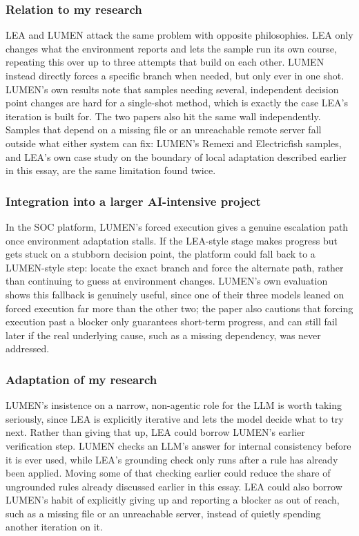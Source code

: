 \documentclass[11pt,a4paper]{article}
\begin{document}
\subsubsection{Relation to my research}

LEA and LUMEN attack the same problem with opposite philosophies.
LEA only changes what the environment reports and lets the sample run its own course, repeating this over up to three attempts that build on each other.
LUMEN instead directly forces a specific branch when needed, but only ever in one shot.
LUMEN's own results note that samples needing several, independent decision point changes are hard for a single-shot method, which is exactly the case LEA's iteration is built for.
The two papers also hit the same wall independently.
Samples that depend on a missing file or an unreachable remote server fall outside what either system can fix: LUMEN's Remexi and Electricfish samples, and LEA's own case study on the boundary of local adaptation described earlier in this essay, are the same limitation found twice.

\subsubsection{Integration into a larger AI-intensive project}

In the SOC platform, LUMEN's forced execution gives a genuine escalation path once environment adaptation stalls.
If the LEA-style stage makes progress but gets stuck on a stubborn decision point, the platform could fall back to a LUMEN-style step: locate the exact branch and force the alternate path, rather than continuing to guess at environment changes.
LUMEN's own evaluation shows this fallback is genuinely useful, since one of their three models leaned on forced execution far more than the other two; the paper also cautions that forcing execution past a blocker only guarantees short-term progress, and can still fail later if the real underlying cause, such as a missing dependency, was never addressed.

\subsubsection{Adaptation of my research}

LUMEN's insistence on a narrow, non-agentic role for the LLM is worth taking seriously, since LEA is explicitly iterative and lets the model decide what to try next.
Rather than giving that up, LEA could borrow LUMEN's earlier verification step.
LUMEN checks an LLM's answer for internal consistency before it is ever used, while LEA's grounding check only runs after a rule has already been applied.
Moving some of that checking earlier could reduce the share of ungrounded rules already discussed earlier in this essay.
LEA could also borrow LUMEN's habit of explicitly giving up and reporting a blocker as out of reach, such as a missing file or an unreachable server, instead of quietly spending another iteration on it.
\end{document}
